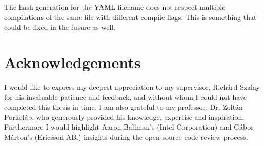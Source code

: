 The hash generation for the YAML filename does not respect multiple compilations of the same file with different compile flags. This is something
that could be fixed in the future as well.

\section*{Acknowledgements}

I would like to express my deepest appreciation to my supervisor, Richárd Szalay for his invaluable patience and feedback, and without whom
I could not have completed this thesis in time. I am also grateful to my professor, Dr. Zoltán Porkoláb, who generously provided his knowledge,
expertise and inspiration. Furthermore I would highlight Aaron Ballman's (Intel Corporation) and Gábor Márton's (Ericsson AB.) insights during
the open-source code review process.
